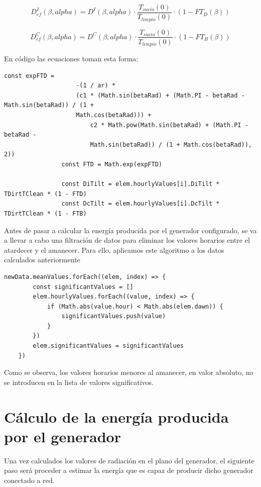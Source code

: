 \begin{equation}
D_{ef}^I(\beta, alpha) = D^I(\beta, alpha) \cdot \frac{T_{sucio}(0)}{T_{limpio}(0)} \cdot (1-FT_D(\beta))
\end{equation}

\begin{equation}
D_{ef}^C(\beta, alpha) = D^C(\beta, alpha) \cdot \frac{T_{sucio}(0)}{T_{limpio}(0)} \cdot (1-FT_B(\beta))
\end{equation}

En código las ecuaciones toman esta forma:
\begin{lstlisting}[style=ES6, caption={Cálculo de las componentes efectivas}]
				const expFTD =
					-(1 / ar) *
					(c1 * (Math.sin(betaRad) + (Math.PI - betaRad - Math.sin(betaRad)) / (1 + 
					Math.cos(betaRad))) +
						c2 * Math.pow(Math.sin(betaRad) + (Math.PI - betaRad - 
						Math.sin(betaRad)) / (1 + Math.cos(betaRad)), 2))
				const FTD = Math.exp(expFTD)

				const DiTilt = elem.hourlyValues[i].DiTilt * TDirtTClean * (1 - FTD)
				const DcTilt = elem.hourlyValues[i].DcTilt * TDirtTClean * (1 - FTB)
\end{lstlisting}

Antes de pasar a calcular la energía producida por el generador configurado, se va a llevar a cabo una filtración de datos para eliminar los valores horarios entre el atardecer y el amanecer.
Para ello, aplicamos este algoritmo a los datos calculados anteriormente
\begin{lstlisting}[style=ES6, caption={Selección de los valores clave}]
	newData.meanValues.forEach((elem, index) => {
		const significantValues = []
		elem.hourlyValues.forEach((value, index) => {
			if (Math.abs(value.hour) < Math.abs(elem.dawn)) {
				significantValues.push(value)
			}
		})
		elem.significantValues = significantValues
	})
\end{lstlisting}
Como se observa, los valores horarios menores al amanecer, en valor absoluto, no se introducen en la lista de valores significativos.

\section{Cálculo de la energía producida por el generador}

Una vez calculados los valores de radiación en el plano del generador, el siguiente paso será proceder a estimar la energía que es capaz de producir dicho generador conectado a red.\\

